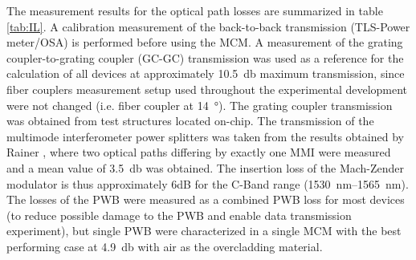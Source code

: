 The measurement results for the optical path losses are summarized in table \ref{tab:IL}. A calibration measurement of the back-to-back transmission (TLS-Power meter/OSA) is performed before using the MCM. A measurement of the grating coupler-to-grating coupler (GC-GC) transmission was used as a reference for the calculation of all devices at approximately \SI{10.5}{\decibel} maximum transmission, since fiber couplers measurement setup used throughout the experimental development were not changed (i.e. fiber coupler at \SI{14}{\degree}). The grating coupler transmission was obtained from test structures located on-chip. The transmission of the multimode interferometer power splitters was taken from the results obtained by Rainer \cite{MMIRainer16}, where two optical paths differing by exactly one MMI were measured and a mean value of \SI{3.5}{\decibel} was obtained. The insertion loss of the Mach-Zender modulator is thus approximately 6dB for the C-Band range (\SIrange{1530}{1565}{\nano\meter}). The losses of the PWB were measured as a combined PWB loss for most devices (to reduce possible damage to the PWB and enable data transmission experiment), but single PWB were characterized in a single MCM with the best performing case at \SI{4.9}{\decibel} with air as the overcladding material.




